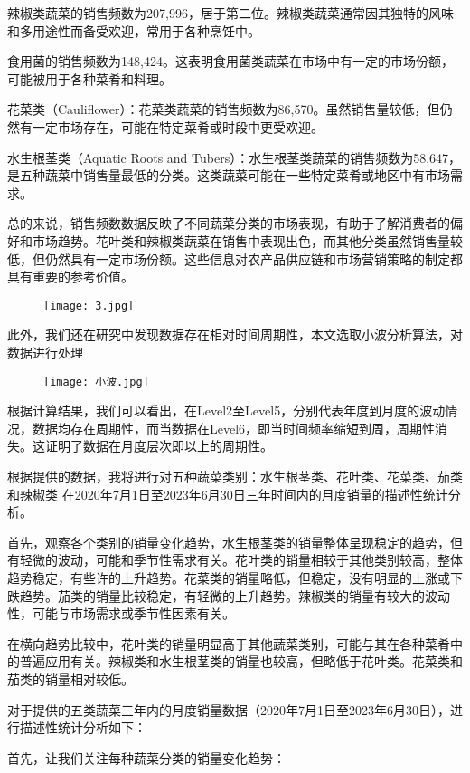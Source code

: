 \documentclass[withoutpreface,bwprint]{cumcmthesis} %
\begin{document}
		辣椒类蔬菜的销售频数为207,996，居于第二位。辣椒类蔬菜通常因其独特的风味和多用途性而备受欢迎，常用于各种烹饪中。
		
		食用菌的销售频数为148,424。这表明食用菌类蔬菜在市场中有一定的市场份额，可能被用于各种菜肴和料理。
		
		花菜类（Cauliflower）：花菜类蔬菜的销售频数为86,570。虽然销售量较低，但仍然有一定市场存在，可能在特定菜肴或时段中更受欢迎。
		
		水生根茎类（Aquatic Roots and Tubers）：水生根茎类蔬菜的销售频数为58,647，是五种蔬菜中销售量最低的分类。这类蔬菜可能在一些特定菜肴或地区中有市场需求。
		
		总的来说，销售频数数据反映了不同蔬菜分类的市场表现，有助于了解消费者的偏好和市场趋势。花叶类和辣椒类蔬菜在销售中表现出色，而其他分类虽然销售量较低，但仍然具有一定市场份额。这些信息对农产品供应链和市场营销策略的制定都具有重要的参考价值。
			\begin{figure}[H]
			\centering
			\texttt{[image: 3.jpg]}
		\end{figure}
		
		此外，我们还在研究中发现数据存在相对时间周期性，本文选取小波分析算法，对数据进行处理
			\begin{figure}[H]
			\centering
			\texttt{[image: 小波.jpg]}
		\end{figure}
		根据计算结果，我们可以看出，在Level2至Level5，分别代表年度到月度的波动情况，数据均存在周期性，而当数据在Level6，即当时间频率缩短到周，周期性消失。这证明了数据在月度层次即以上的周期性。
		
	根据提供的数据，我将进行对五种蔬菜类别：水生根茎类、花叶类、花菜类、茄类和辣椒类
	 在2020年7月1日至2023年6月30日三年时间内的月度销量的描述性统计分析。
	 
	首先，观察各个类别的销量变化趋势，水生根茎类的销量整体呈现稳定的趋势，但有轻微的波动，可能和季节性需求有关。花叶类的销量相较于其他类别较高，整体趋势稳定，有些许的上升趋势。花菜类的销量略低，但稳定，没有明显的上涨或下跌趋势。茄类的销量比较稳定，有轻微的上升趋势。辣椒类的销量有较大的波动性，可能与市场需求或季节性因素有关。
	
	在横向趋势比较中，花叶类的销量明显高于其他蔬菜类别，可能与其在各种菜肴中的普遍应用有关。辣椒类和水生根茎类的销量也较高，但略低于花叶类。花菜类和茄类的销量相对较低。
	
	对于提供的五类蔬菜三年内的月度销量数据（2020年7月1日至2023年6月30日），进行描述性统计分析如下：
	
	首先，让我们关注每种蔬菜分类的销量变化趋势：
	
\end{document}
